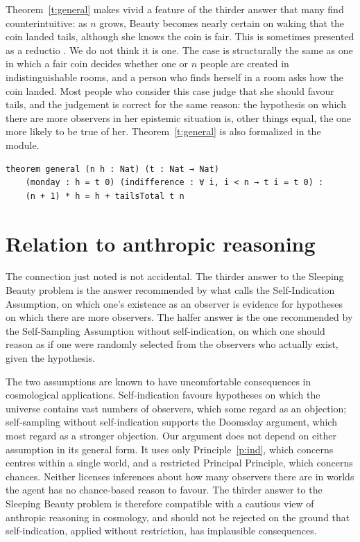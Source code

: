 \documentclass{situationist-preprint}
\begin{document}
Theorem~\ref{t:general} makes vivid a feature of the thirder answer that many find counterintuitive: as $n$ grows, Beauty becomes nearly certain on waking that the coin landed tails, although she knows the coin is fair. This is sometimes presented as a reductio \citep{Bostrom2007}. We do not think it is one. The case is structurally the same as one in which a fair coin decides whether one or $n$ people are created in indistinguishable rooms, and a person who finds herself in a room asks how the coin landed. Most people who consider this case judge that she should favour tails, and the judgement is correct for the same reason: the hypothesis on which there are more observers in her epistemic situation is, other things equal, the one more likely to be true of her. Theorem~\ref{t:general} is also formalized in the module.

\begin{lstlisting}
theorem general (n h : Nat) (t : Nat → Nat)
    (monday : h = t 0) (indifference : ∀ i, i < n → t i = t 0) :
    (n + 1) * h = h + tailsTotal t n
\end{lstlisting}

\section{Relation to anthropic reasoning}

The connection just noted is not accidental. The thirder answer to the Sleeping Beauty problem is the answer recommended by what \citet{Bostrom2002} calls the Self-Indication Assumption, on which one's existence as an observer is evidence for hypotheses on which there are more observers. The halfer answer is the one recommended by the Self-Sampling Assumption without self-indication, on which one should reason as if one were randomly selected from the observers who actually exist, given the hypothesis.

The two assumptions are known to have uncomfortable consequences in cosmological applications. Self-indication favours hypotheses on which the universe contains vast numbers of observers, which some regard as an objection; self-sampling without self-indication supports the Doomsday argument, which most regard as a stronger objection. Our argument does not depend on either assumption in its general form. It uses only Principle~\ref{p:ind}, which concerns centres within a single world, and a restricted Principal Principle, which concerns chances. Neither licenses inferences about how many observers there are in worlds the agent has no chance-based reason to favour. The thirder answer to the Sleeping Beauty problem is therefore compatible with a cautious view of anthropic reasoning in cosmology, and should not be rejected on the ground that self-indication, applied without restriction, has implausible consequences.
\end{document}
